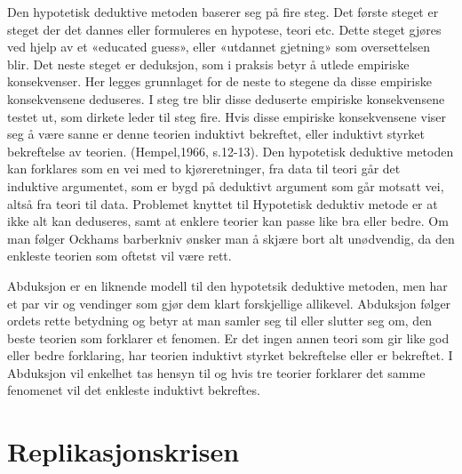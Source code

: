 \documentclass[
]{book}
\begin{document}
Den hypotetisk deduktive metoden baserer seg på fire steg. Det første steget er steget der det dannes eller formuleres en hypotese, teori etc. Dette steget gjøres ved hjelp av et «educated guess», eller «utdannet gjetning» som oversettelsen blir. Det neste steget er deduksjon, som i praksis betyr å utlede empiriske konsekvenser. Her legges grunnlaget for de neste to stegene da disse empiriske konsekvensene deduseres. I steg tre blir disse deduserte empiriske konsekvensene testet ut, som dirkete leder til steg fire. Hvis disse empiriske konsekvensene viser seg å være sanne er denne teorien induktivt bekreftet, eller induktivt styrket bekreftelse av teorien. (Hempel,1966, s.12-13). Den hypotetisk deduktive metoden kan forklares som en vei med to kjøreretninger, fra data til teori går det induktive argumentet, som er bygd på deduktivt argument som går motsatt vei, altså fra teori til data. Problemet knyttet til Hypotetisk deduktiv metode er at ikke alt kan deduseres, samt at enklere teorier kan passe like bra eller bedre. Om man følger Ockhams barberkniv ønsker man å skjære bort alt unødvendig, da den enkleste teorien som oftetst vil være rett.

Abduksjon er en liknende modell til den hypotetsik deduktive metoden, men har et par vir og vendinger som gjør dem klart forskjellige allikevel. Abduksjon følger ordets rette betydning og betyr at man samler seg til eller slutter seg om, den beste teorien som forklarer et fenomen. Er det ingen annen teori som gir like god eller bedre forklaring, har teorien induktivt styrket bekreftelse eller er bekreftet. I Abduksjon vil enkelhet tas hensyn til og hvis tre teorier forklarer det samme fenomenet vil det enkleste induktivt bekreftes.

\hypertarget{replikasjonskrisen}{%
\section{Replikasjonskrisen}\label{replikasjonskrisen}}
\end{document}
